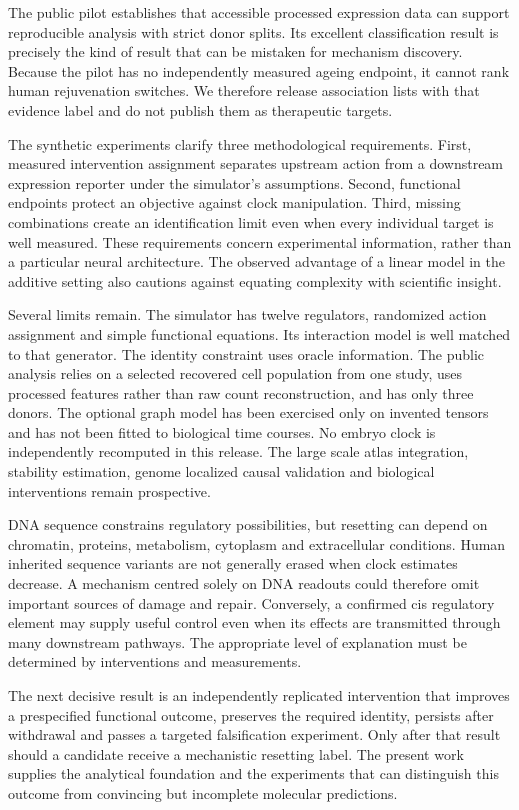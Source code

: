 \documentclass[
  11pt,
  letterpaper,
]{article}
\begin{document}
The public pilot establishes that accessible processed expression data
can support reproducible analysis with strict donor splits. Its
excellent classification result is precisely the kind of result that can
be mistaken for mechanism discovery. Because the pilot has no
independently measured ageing endpoint, it cannot rank human
rejuvenation switches. We therefore release association lists with that
evidence label and do not publish them as therapeutic targets.

The synthetic experiments clarify three methodological requirements.
First, measured intervention assignment separates upstream action from a
downstream expression reporter under the simulator's assumptions.
Second, functional endpoints protect an objective against clock
manipulation. Third, missing combinations create an identification limit
even when every individual target is well measured. These requirements
concern experimental information, rather than a particular neural
architecture. The observed advantage of a linear model in the additive
setting also cautions against equating complexity with scientific
insight.

Several limits remain. The simulator has twelve regulators, randomized
action assignment and simple functional equations. Its interaction model
is well matched to that generator. The identity constraint uses oracle
information. The public analysis relies on a selected recovered cell
population from one study, uses processed features rather than raw count
reconstruction, and has only three donors. The optional graph model has
been exercised only on invented tensors and has not been fitted to
biological time courses. No embryo clock is independently recomputed in
this release. The large scale atlas integration, stability estimation,
genome localized causal validation and biological interventions remain
prospective.

DNA sequence constrains regulatory possibilities, but resetting can
depend on chromatin, proteins, metabolism, cytoplasm and extracellular
conditions. Human inherited sequence variants are not generally erased
when clock estimates decrease. A mechanism centred solely on DNA
readouts could therefore omit important sources of damage and repair.
Conversely, a confirmed cis regulatory element may supply useful control
even when its effects are transmitted through many downstream pathways.
The appropriate level of explanation must be determined by interventions
and measurements.

The next decisive result is an independently replicated intervention
that improves a prespecified functional outcome, preserves the required
identity, persists after withdrawal and passes a targeted falsification
experiment. Only after that result should a candidate receive a
mechanistic resetting label. The present work supplies the analytical
foundation and the experiments that can distinguish this outcome from
convincing but incomplete molecular predictions.
\end{document}
